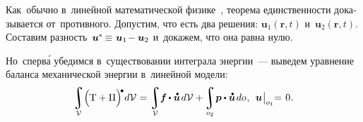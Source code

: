 \begin{otherlanguage}{russian}

Как~обычно в~линейной математической физике~\cite{lurie-theoryofelasticity, tihonovsamarsky-mathphysicsequations}, теорема единственности доказывается от~противного. Допустим, что есть два решения: ${\bm{u}_1 (\bm{r}, t)}$ и~${\bm{u}_2 (\bm{r}, t)}$. Составим разность~${\bm{u}^{\hspace{-0.1ex}*} \hspace{-0.2ex} \equiv \hspace{0.12ex} \bm{u}_1 \hspace{-0.32ex} - \bm{u}_2}$ и~докажем, что она равна нулю.

Но~сперв\'{а} убедимся в~существовании интеграла энергии~--- выведем уравнение баланса механической энергии в~линейной модели:
\begin{equation}\label{dynamicsoflineartheory:integralofenergy}
\integral\displaylimits_{\mathcal{V}} \hspace{-0.42ex} \left(^{\mathstrut} \hspace{-0.2ex} \mathrm{T} + \Pi \right)^{\hspace{-0.12em}\tikz[baseline=-0.2ex] \draw[black, fill=black] (0,0) circle (.28ex);} \hspace{-0.25ex} d\mathcal{V} \hspace{.1ex} =
\integral\displaylimits_{\mathcal{V}} \hspace{-0.5ex} \bm{f} \hspace{-0.1ex} \dotp \mathdotabove{\bm{u}} \hspace{0.25ex} d\mathcal{V} + \hspace{-0.12ex}
\integral\displaylimits_{o_2} \hspace{-0.32ex} \bm{p} \dotp \mathdotabove{\bm{u}} \hspace{0.25ex} do \hspace{.1ex}, \:\:
\bm{u} \hspace{0.1ex} \bigr|_{o_1} \hspace{-0.64ex} = \hspace{0.2ex} 0 \hspace{.1ex}.
\end{equation}


\end{otherlanguage}
